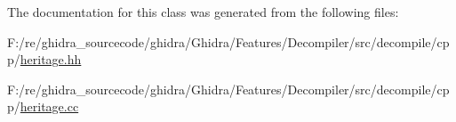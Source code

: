 The documentation for this class was generated from the following files\+:\begin{DoxyCompactItemize}
\item 
F\+:/re/ghidra\+\_\+sourcecode/ghidra/\+Ghidra/\+Features/\+Decompiler/src/decompile/cpp/\mbox{\hyperlink{heritage_8hh}{heritage.\+hh}}\item 
F\+:/re/ghidra\+\_\+sourcecode/ghidra/\+Ghidra/\+Features/\+Decompiler/src/decompile/cpp/\mbox{\hyperlink{heritage_8cc}{heritage.\+cc}}\end{DoxyCompactItemize}
